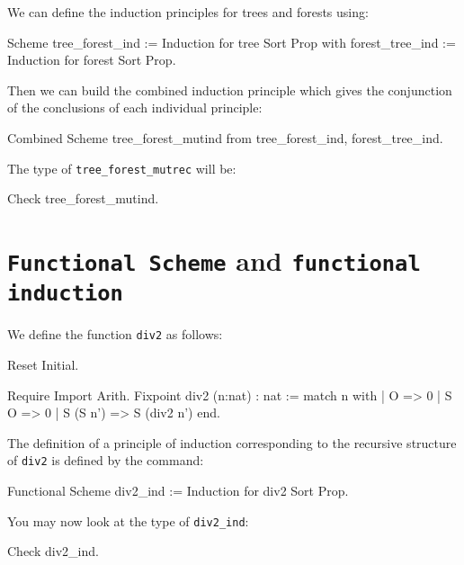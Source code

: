 \begin{coq_example*}
We can define the induction principles for trees and forests using:
\begin{coq_example}
Scheme tree_forest_ind := Induction for tree Sort Prop
  with forest_tree_ind := Induction for forest Sort Prop.
\end{coq_example}

Then we can build the combined induction principle which gives the
conjunction of the conclusions of each individual principle:
\begin{coq_example}
Combined Scheme tree_forest_mutind from tree_forest_ind, forest_tree_ind.
\end{coq_example}

The type of {\tt tree\_forest\_mutrec} will be:
\begin{coq_example}
Check tree_forest_mutind.
\end{coq_example}

\section[{\tt Functional Scheme} and {\tt functional induction}]{{\tt Functional Scheme} and {\tt functional induction}
\label{FunScheme-examples}}

\firstexample
{}

We define the function \texttt{div2} as follows:

\begin{coq_eval}
Reset Initial.
\end{coq_eval}

\begin{coq_example*}
Require Import Arith.
Fixpoint div2 (n:nat) : nat :=
  match n with
  | O => 0
  | S O => 0
  | S (S n') => S (div2 n')
  end.
\end{coq_example*}

The definition of a principle of induction corresponding to the
recursive structure of \texttt{div2} is defined by the command:

\begin{coq_example}
Functional Scheme div2_ind := Induction for div2 Sort Prop.
\end{coq_example}

You may now look at the type of {\tt div2\_ind}:

\begin{coq_example}
Check div2_ind.
\end{coq_example}


\end{coq_example*}
